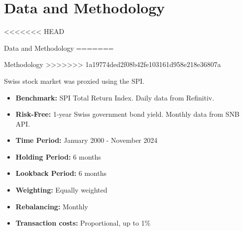 \documentclass[10pt]{beamer}
\begin{document}
\section{Data and Methodology}
<<<<<<< HEAD
\begin{frame}[fragile]{Data and Methodology}
=======
\begin{frame}[fragile]{Methodology}
>>>>>>> 1a19774ded2f08b42fe103161d958e218e36807a

\noindent %
\begin{minipage}[t]{0.45\textwidth} %
    \begin{tcolorbox}[colframe=datagreen, colback=boxbg, coltitle=white, title=Data, sharp corners=all, fonttitle=\bfseries, left=2mm, right=2mm, enhanced, height=6cm]
        Swiss stock market was proxied using the SPI. 
        \begin{itemize}
            \item \textbf{Benchmark:} SPI Total Return Index. Daily data from Refinitiv.
            \item \textbf{Risk-Free:} 1-year Swiss government bond yield. Monthly data from SNB API.
            \item \textbf{Time Period:} January 2000 - November 2024
        \end{itemize}
    \end{tcolorbox}
\end{minipage}%
\hspace{0.05\textwidth} %
\begin{minipage}[t]{0.45\textwidth} %
    \begin{tcolorbox}[colframe=strategyblue, colback=boxbg, coltitle=white, title=Methodology, sharp corners=all, fonttitle=\bfseries, left=2mm, right=2mm, enhanced, height=6cm]
        \begin{itemize}
            \item \textbf{Holding Period:} 6 months
            \item \textbf{Lookback Period:} 6 months
            \item \textbf{Weighting:} Equally weighted
            \item \textbf{Rebalancing:} Monthly
            \item \textbf{Transaction costs:} Proportional, up to 1\%
            
        \end{itemize}
    \end{tcolorbox}
\end{minipage}


\end{frame}
\end{frame}
\end{document}
